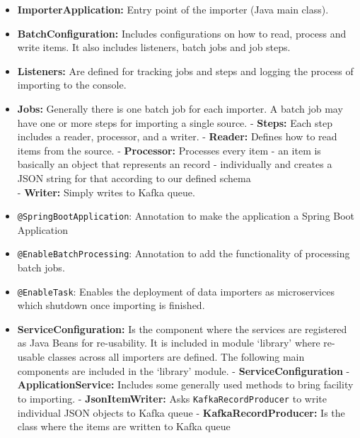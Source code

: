 \begin{itemize}
\tightlist
\item
  \textbf{ImporterApplication:} Entry point of the importer (Java main
  class).
\item
  \textbf{BatchConfiguration:} Includes configurations on how to read,
  process and write items. It also includes listeners, batch jobs and
  job steps.
\item
  \textbf{Listeners:} Are defined for tracking jobs and steps and
  logging the process of importing to the console.
\item
  \textbf{Jobs:} Generally there is one batch job for each importer. A
  batch job may have one or more steps for importing a single source. -
  \textbf{Steps:} Each step includes a reader, processor, and a writer.
  - \textbf{Reader:} Defines how to read items from the source. -
  \textbf{Processor:} Processes every item - an item is basically an
  object that represents an record - individually and creates a JSON
  string for that according to our defined schema\\
  - \textbf{Writer:} Simply writes to Kafka queue.
\item
  \texttt{@SpringBootApplication}: Annotation to make the application a
  Spring Boot Application
\item
  \texttt{@EnableBatchProcessing}: Annotation to add the functionality
  of processing batch jobs.
\item
  \texttt{@EnableTask}: Enables the deployment of data importers as
  microservices which shutdown once importing is finished.
\item
  \textbf{ServiceConfiguration:} Is the component where the services are
  registered as Java Beans for re-usability. It is included in module
  `library' where re-usable classes across all importers are defined.
  The following main components are included in the `library' module. -
  \textbf{ServiceConfiguration} - \textbf{ApplicationService:} Includes
  some generally used methods to bring facility to importing. -
  \textbf{JsonItemWriter:} Asks \texttt{KafkaRecordProducer} to write
  individual JSON objects to Kafka queue - \textbf{KafkaRecordProducer:}
  Is the class where the items are written to Kafka queue
\end{itemize}

